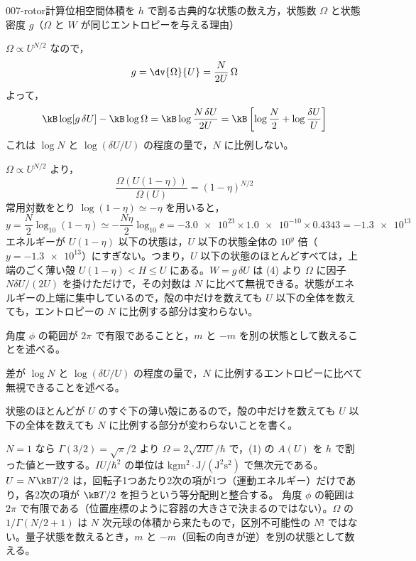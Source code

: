 \documentclass[uplatex,dvipdfmx,a4paper,11pt]{jsarticle}
\begin{document}
\begin{mondai}{007-rotor}{計算}{位相空間体積を $h$ で割る古典的な状態の数え方，状態数 $\Omega$ と状態密度 $g$（$\Omega$ と $W$ が同じエントロピーを与える理由）}
\begin{tadashii}
 $\Omega\propto U^{N/2}$ なので，
\[g=\dv{\Omega}{U}=\frac{N}{2U}\,\Omega\]
よって，
\[\kB\log[g\,\delta U]-\kB\log \Omega=\kB\log\frac{N\,\delta U}{2U}=\kB\left[\log\frac{N}{2}+\log\frac{\delta U}{U}\right]\]
これは $\log N$ と $\log(\delta U/U)$ の程度の量で，$N$ に比例しない。

 $\Omega\propto U^{N/2}$ より，
\[\frac{\Omega(U(1-\eta))}{\Omega(U)}=(1-\eta)^{N/2}\]
常用対数をとり $\log(1-\eta)\simeq-\eta$ を用いると，
\[y=\frac{N}{2}\log_{10}(1-\eta)\simeq-\frac{N\eta}{2}\log_{10}\ee=-\num{3.0e23}\times\num{1.0e-10}\times\num{0.4343}=-\num{1.3e13}\]
エネルギーが $U(1-\eta)$ 以下の状態は，$U$ 以下の状態全体の $10^{y}$ 倍（$y=-\num{1.3e13}$）にすぎない。つまり，$U$ 以下の状態のほとんどすべては，上端のごく薄い殻 $U(1-\eta)<H\le U$ にある。$W=g\,\delta U$ は (4) より $\Omega$ に因子 $N\delta U/(2U)$ を掛けただけで，その対数は $N$ に比べて無視できる。状態がエネルギーの上端に集中しているので，殻の中だけを数えても $U$ 以下の全体を数えても，エントロピーの $N$ に比例する部分は変わらない。
\begin{ronten}
  \item {} 角度 $\phi$ の範囲が $2\pi$ で有限であることと，$m$ と $-m$ を別の状態として数えることを述べる。
  \item {} 差が $\log N$ と $\log(\delta U/U)$ の程度の量で，$N$ に比例するエントロピーに比べて無視できることを述べる。
  \item {} 状態のほとんどが $U$ のすぐ下の薄い殻にあるので，殻の中だけを数えても $U$ 以下の全体を数えても $N$ に比例する部分が変わらないことを書く。
\end{ronten}
\kenzan $N=1$ なら $\Gamma(3/2)=\sqrt{\pi}/2$ より $\Omega=2\sqrt{2IU}/\hbar$ で，(1) の $A(U)$ を $h$ で割った値と一致する。$IU/\hbar^{2}$ の単位は $\unit{\kilogram\metre\squared}\cdot\unit{\joule}/(\unit{\joule\squared\second\squared})$ で無次元である。$U=N\kB T/2$ は，回転子1つあたり2次の項が1つ（運動エネルギー）だけであり，各2次の項が $\kB T/2$ を担うという等分配則と整合する。
\tsumazuki 角度 $\phi$ の範囲は $2\pi$ で有限である（位置座標のように容器の大きさで決まるのではない）。$\Omega$ の $1/\Gamma(N/2+1)$ は $N$ 次元球の体積から来たもので，区別不可能性の $N!$ ではない。量子状態を数えるとき，$m$ と $-m$（回転の向きが逆）を別の状態として数える。
\end{tadashii}
\end{mondai}
\end{document}
